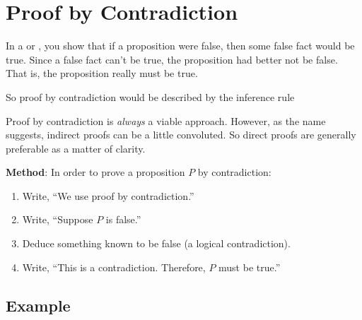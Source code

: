 \begin{problems}

\classproblems
{}

\homeworkproblems
{}
\end{problems}

\section{Proof by Contradiction}\label{contradiction_sec}

In a  or , you show that
if a proposition were false, then some false fact would be true.  Since a
false fact can't be true, the proposition had better not be false.  That
is, the proposition really must be true. 

\begin{editingnotes}

So proof by contradiction would be described by the inference rule
\begin{rul*}
\end{rul*}

\end{editingnotes}

Proof by contradiction is \emph{always} a viable approach.  However, as
the name suggests, indirect proofs can be a little convoluted.  So direct
proofs are generally preferable as a matter of clarity.

\textbf{Method}: In order to prove a proposition $P$ by contradiction:

\begin{enumerate}

\item Write, ``We use proof by contradiction.''

\item Write, ``Suppose $P$ is false.''

\item Deduce something known to be false (a logical contradiction).

\item Write, ``This is a contradiction.  Therefore, $P$ must be
true.''

\end{enumerate}

\subsection*{Example}

